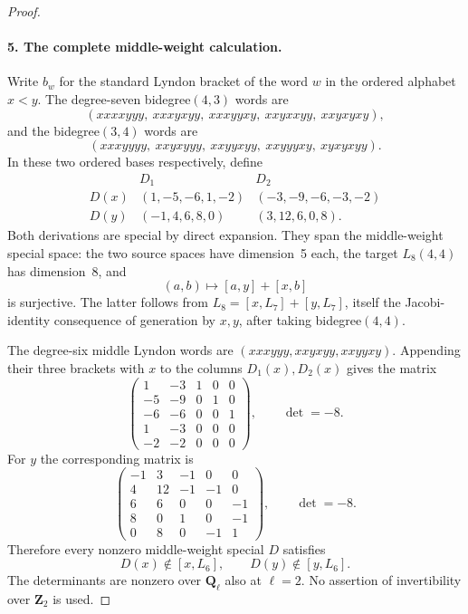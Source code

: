 \begin{proof}
\paragraph{5. The complete middle-weight calculation.}
Write $b_w$ for the standard Lyndon bracket of the word $w$ in the
ordered alphabet $x<y$. The degree-seven bidegree$(4,3)$ words are
\[
 (xxxxyyy,\ xxxyxyy,\ xxxyyxy,\ xxyxxyy,\ xxyxyxy),
\]
and the bidegree$(3,4)$ words are
\[
 (xxxyyyy,\ xxyxyyy,\ xxyyxyy,\ xxyyyxy,\ xyxyxyy).
\]
In these two ordered bases respectively, define
\[
\begin{array}{c|rr}
 &D_1&D_2\\\hline
 D(x)&(1,-5,-6,1,-2)&(-3,-9,-6,-3,-2)\\
 D(y)&(-1,4,6,8,0)&(3,12,6,0,8).
\end{array}
\]
Both derivations are special by direct expansion. They span the
middle-weight special space: the two source spaces have dimension~5
each, the target $L_8(4,4)$ has dimension~8, and
\[
 (a,b)\longmapsto[a,y]+[x,b]
\]
is surjective. The latter follows from
$L_8=[x,L_7]+[y,L_7]$, itself the Jacobi-identity consequence of
generation by $x,y$, after taking bidegree$(4,4)$.

The degree-six middle Lyndon words are
$(xxxyyy,xxyxyy,xxyyxy)$. Appending their three brackets with $x$
to the columns $D_1(x),D_2(x)$ gives the matrix
\[
 \begin{pmatrix}
 1&-3&1&0&0\\-5&-9&0&1&0\\-6&-6&0&0&1\\
 1&-3&0&0&0\\-2&-2&0&0&0
 \end{pmatrix},\qquad\det=-8.
\]
For $y$ the corresponding matrix is
\[
 \begin{pmatrix}
 -1&3&-1&0&0\\4&12&-1&-1&0\\6&6&0&0&-1\\
 8&0&1&0&-1\\0&8&0&-1&1
 \end{pmatrix},\qquad\det=-8.
\]
Therefore every nonzero middle-weight special $D$ satisfies
\[
 D(x)\notin[x,L_6],\qquad D(y)\notin[y,L_6].
\]
The determinants are nonzero over $\mathbf Q_\ell$ also at
$\ell=2$. No assertion of invertibility over $\mathbf Z_2$ is used.


\end{proof}
